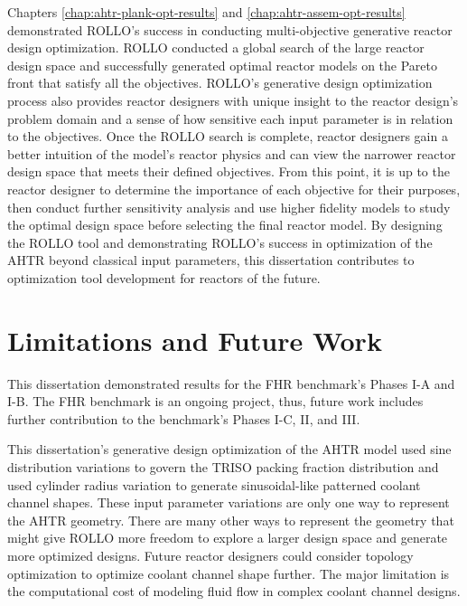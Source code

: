 Chapters \ref{chap:ahtr-plank-opt-results} and \ref{chap:ahtr-assem-opt-results} 
demonstrated \gls{ROLLO}'s success in conducting multi-objective generative reactor 
design optimization. 
\gls{ROLLO} conducted a global search of the large reactor design space and successfully 
generated optimal reactor models on the Pareto front that satisfy all the objectives. 
\gls{ROLLO}'s generative design optimization process also provides reactor designers 
with unique insight to the reactor design's problem domain and a sense of how 
sensitive each input parameter is in relation to the objectives. 
Once the \gls{ROLLO} search is complete, reactor designers gain a better intuition of 
the model's reactor physics and can view the narrower reactor design space that meets 
their defined objectives.   
From this point, it is up to the reactor designer to determine the importance of each 
objective for their purposes, then conduct further sensitivity analysis and 
use higher fidelity models to study the optimal design space before selecting 
the final reactor model.
By designing the \gls{ROLLO} tool and demonstrating \gls{ROLLO}'s success in 
optimization of the \gls{AHTR} beyond classical input parameters, this dissertation 
contributes to optimization tool development for reactors of the future. 

\section{Limitations and Future Work}
This dissertation demonstrated results for the \gls{FHR} benchmark's Phases I-A and I-B.
The \gls{FHR} benchmark is an ongoing project, thus, future work includes further 
contribution to the benchmark's Phases I-C, II, and III. 

This dissertation's generative design optimization of the \gls{AHTR} model used sine 
distribution variations to govern the \gls{TRISO} packing fraction distribution and  
used cylinder radius variation to generate sinusoidal-like patterned coolant channel 
shapes. 
These input parameter variations are only one way to represent the \gls{AHTR} 
geometry. 
There are many other ways to represent the geometry that might give \gls{ROLLO} more 
freedom to explore a larger design space and generate more optimized designs. 
Future reactor designers could consider topology optimization to optimize coolant 
channel shape further.
The major limitation is the computational cost of modeling fluid flow in complex 
coolant channel designs. 

